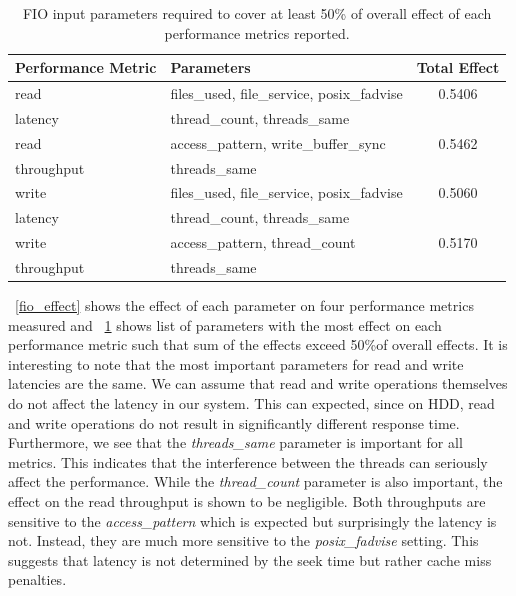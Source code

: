 \begin{table}[!t]
\caption{FIO input parameters required to cover at least 50\% of overall effect of each performance metrics reported.}
\label{fio_50_t}
\centering
\begin{tabularx}{\textwidth}{
  l | 
  X 
  c
}
\hline
\bfseries Performance Metric &\bfseries Parameters &\bfseries Total Effect\\
\hline\hline
read        & files\_used, file\_service, posix\_fadvise  &0.5406   \\
latency     & thread\_count, threads\_same                &         \\
\hline
read        & access\_pattern, write\_buffer\_sync        &0.5462   \\
throughput  & threads\_same                               &         \\
\hline
write       & files\_used, file\_service, posix\_fadvise  &0.5060   \\
latency     & thread\_count, threads\_same                &         \\
\hline
write       & access\_pattern, thread\_count              &0.5170   \\
throughput  & threads\_same                               &         \\
\hline
\end{tabularx}
\end{table}

\figurename~\ref{fio_effect} shows the effect of each parameter on four performance metrics measured and \tablename~\ref{fio_50_t} shows list of parameters with the most effect on each performance metric such that sum of the effects exceed 50\%of overall effects. It is interesting to note that the most important parameters for read and write latencies are the same. We can assume that read and write operations themselves do not affect the latency in our system. This can expected, since on HDD, read and write operations do not result in significantly different response time.  Furthermore, we see that the \emph{threads\_same} parameter is important for all metrics. This indicates that the interference between the threads can seriously affect the performance. While the \emph{thread\_count} parameter is also important, the effect on the read throughput is shown to be negligible. Both throughputs are sensitive to the \emph{access\_pattern} which is expected but surprisingly the latency is not. Instead, they are much more sensitive to the \emph{posix\_fadvise} setting. This suggests that latency is not determined by the seek time but rather cache miss penalties. 

